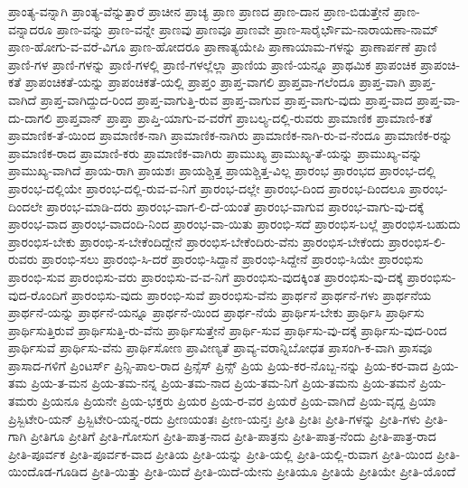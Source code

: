 {ಪ್ರಾಂತ್ಯ-ವನ್ನಾಗಿ
ಪ್ರಾಂತ್ಯ-ವೆನ್ನುತ್ತಾರೆ
ಪ್ರಾಚೀನ
ಪ್ರಾಚ್ಯ
ಪ್ರಾಣ
ಪ್ರಾಣದ
ಪ್ರಾಣ-ದಾನ
ಪ್ರಾಣ-ಬಿಡುತ್ತೇನೆ
ಪ್ರಾಣ-ವನ್ನಾದರೂ
ಪ್ರಾಣ-ವನ್ನು
ಪ್ರಾಣ-ವನ್ನೇ
ಪ್ರಾಣವು
ಪ್ರಾಣವೂ
ಪ್ರಾಣವೇ
ಪ್ರಾಣ-ಸಾರೈರ್ಭೌಮ-ನಾರಾಯಣಾ-ನಾಮ್
ಪ್ರಾಣ-ಹೋಗು-ವ-ವರೆ-ವಿಗೂ
ಪ್ರಾಣ-ಹೋದರೂ
ಪ್ರಾಣಾತ್ಯಯೇಪಿ
ಪ್ರಾಣಾಯಾಮ-ಗಳನ್ನು
ಪ್ರಾಣಾರ್ಪಣೆ
ಪ್ರಾಣಿ
ಪ್ರಾಣಿ-ಗಳ
ಪ್ರಾಣಿ-ಗಳನ್ನು
ಪ್ರಾಣಿ-ಗಳಲ್ಲಿ
ಪ್ರಾಣಿ-ಗಳಲ್ಲೆಲ್ಲಾ
ಪ್ರಾಣಿಯ
ಪ್ರಾಣಿ-ಯನ್ನೂ
ಪ್ರಾಥಮಿಕ
ಪ್ರಾಪಂಚಿಕ
ಪ್ರಾಪಂಚಿ-ಕತೆ
ಪ್ರಾಪಂಚಿಕತೆ-ಯನ್ನು
ಪ್ರಾಪಂಚಿಕತೆ-ಯಲ್ಲಿ
ಪ್ರಾಪ್ತಂ
ಪ್ರಾಪ್ತ-ವಾಗಲಿ
ಪ್ರಾಪ್ತವಾ-ಗಲೆಂದೂ
ಪ್ರಾಪ್ತ-ವಾಗಿ
ಪ್ರಾಪ್ತ-ವಾಗಿದೆ
ಪ್ರಾಪ್ತ-ವಾಗಿದ್ದುದ-ರಿಂದ
ಪ್ರಾಪ್ತ-ವಾಗುತ್ತಿ-ರುವ
ಪ್ರಾಪ್ತ-ವಾಗುವ
ಪ್ರಾಪ್ತ-ವಾಗು-ವುದು
ಪ್ರಾಪ್ತ-ವಾದ
ಪ್ರಾಪ್ತ-ವಾ-ದು-ದಾಗಲಿ
ಪ್ರಾಪ್ತವಾನ್
ಪ್ರಾಪ್ತಾ
ಪ್ರಾಪ್ತಿ-ಯಾಗು-ವ-ವರೆಗೆ
ಪ್ರಾಬಲ್ಯ-ದಲ್ಲಿ-ರುವರು
ಪ್ರಾಮಾಣಿಕ
ಪ್ರಾಮಾಣಿ-ಕತೆ
ಪ್ರಾಮಾಣಿಕ-ತೆ-ಯಿಂದ
ಪ್ರಾಮಾಣಿಕ-ನಾಗಿ
ಪ್ರಾಮಾಣಿಕ-ನಾಗಿರು
ಪ್ರಾಮಾಣಿಕ-ನಾಗಿ-ರು-ವ-ನೆಂದೂ
ಪ್ರಾಮಾಣಿಕ-ರನ್ನು
ಪ್ರಾಮಾಣಿಕ-ರಾದ
ಪ್ರಾಮಾಣಿ-ಕರು
ಪ್ರಾಮಾಣಿಕ-ವಾಗಿರು
ಪ್ರಾಮುಖ್ಯ
ಪ್ರಾಮುಖ್ಯ-ತೆ-ಯನ್ನು
ಪ್ರಾಮುಖ್ಯ-ವನ್ನು
ಪ್ರಾಮುಖ್ಯ-ವಾಗಿದೆ
ಪ್ರಾಯ-ರಾಗಿ
ಪ್ರಾಯಶಃ
ಪ್ರಾಯಶ್ಚಿತ್ತ
ಪ್ರಾಯಶ್ಚಿತ್ತ-ವಿಲ್ಲ
ಪ್ರಾರಂಭ
ಪ್ರಾರಂಭದ
ಪ್ರಾರಂಭ-ದಲ್ಲಿ
ಪ್ರಾರಂಭ-ದಲ್ಲಿಯೇ
ಪ್ರಾರಂಭ-ದಲ್ಲಿ-ರುವ-ವ-ನಿಗೆ
ಪ್ರಾರಂಭ-ದಲ್ಲೇ
ಪ್ರಾರಂಭ-ದಿಂದ
ಪ್ರಾರಂಭ-ದಿಂದಲೂ
ಪ್ರಾರಂಭ-ದಿಂದಲೇ
ಪ್ರಾರಂಭ-ಮಾಡಿ-ದರು
ಪ್ರಾರಂಭ-ವಾಗ-ಲಿ-ದೆ-ಯಂತೆ
ಪ್ರಾರಂಭ-ವಾಗುವ
ಪ್ರಾರಂಭ-ವಾಗು-ವು-ದಕ್ಕೆ
ಪ್ರಾರಂಭ-ವಾದ
ಪ್ರಾರಂಭ-ವಾದಂದಿ-ನಿಂದ
ಪ್ರಾರಂಭ-ವಾ-ಯಿತು
ಪ್ರಾರಂಭಿ-ಸದೆ
ಪ್ರಾರಂಭಿಸ-ಬಲ್ಲೆ
ಪ್ರಾರಂಭಿಸ-ಬಹುದು
ಪ್ರಾರಂಭಿಸ-ಬೇಕು
ಪ್ರಾರಂಭಿ-ಸ-ಬೇಕೆಂದಿದ್ದೇನೆ
ಪ್ರಾರಂಭಿಸ-ಬೇಕೆಂದಿರು-ವೆನು
ಪ್ರಾರಂಭಿಸ-ಬೇಕೆಂದು
ಪ್ರಾರಂಭಿಸ-ಲಿ-ರುವರು
ಪ್ರಾರಂಭಿ-ಸಲು
ಪ್ರಾರಂಭಿ-ಸಿ-ದರೆ
ಪ್ರಾರಂಭಿ-ಸಿದ್ದಾನೆ
ಪ್ರಾರಂಭಿ-ಸಿದ್ದೇನೆ
ಪ್ರಾರಂಭಿ-ಸಿಯೇ
ಪ್ರಾರಂಭಿಸು
ಪ್ರಾರಂಭಿ-ಸುವ
ಪ್ರಾರಂಭಿಸು-ವರು
ಪ್ರಾರಂಭಿಸು-ವ-ವ-ನಿಗೆ
ಪ್ರಾರಂಭಿಸು-ವುದಕ್ಕಿಂತ
ಪ್ರಾರಂಭಿಸು-ವು-ದಕ್ಕೆ
ಪ್ರಾರಂಭಿಸು-ವುದ-ರೊಂದಿಗೆ
ಪ್ರಾರಂಭಿಸು-ವುದು
ಪ್ರಾರಂಭಿ-ಸುವೆ
ಪ್ರಾರಂಭಿಸು-ವೆನು
ಪ್ರಾರ್ಥನೆ
ಪ್ರಾರ್ಥನೆ-ಗಳು
ಪ್ರಾರ್ಥನೆಯ
ಪ್ರಾರ್ಥನೆ-ಯನ್ನು
ಪ್ರಾರ್ಥನೆ-ಯನ್ನೂ
ಪ್ರಾರ್ಥನೆ-ಯಿಂದ
ಪ್ರಾರ್ಥ-ನೆಯೆ
ಪ್ರಾರ್ಥಿಸ-ಬೇಕು
ಪ್ರಾರ್ಥಿಸಿ
ಪ್ರಾರ್ಥಿಸು
ಪ್ರಾರ್ಥಿಸುತ್ತಿರುವೆ
ಪ್ರಾರ್ಥಿಸುತ್ತಿ-ರು-ವೆನು
ಪ್ರಾರ್ಥಿಸುತ್ತೇನೆ
ಪ್ರಾರ್ಥಿ-ಸುವ
ಪ್ರಾರ್ಥಿಸು-ವು-ದಕ್ಕೆ
ಪ್ರಾರ್ಥಿಸು-ವುದ-ರಿಂದ
ಪ್ರಾರ್ಥಿಸುವೆ
ಪ್ರಾರ್ಥಿಸು-ವೆನು
ಪ್ರಾರ್ಥಿಸೋಣ
ಪ್ರಾವೀಣ್ಯತೆ
ಪ್ರಾವ್ಯ-ವರಾನ್ನಿಬೋಧತ
ಪ್ರಾಸಂಗಿ-ಕ-ವಾಗಿ
ಪ್ರಾಸವೂ
ಪ್ರಾಸಾದ-ಗಳಿಗೆ
ಪ್ರಿಂಟರ್ಸ್
ಪ್ರಿನ್ಸಿ-ಪಾಲ-ರಾದ
ಪ್ರಿನ್ಸೆಸ್
ಪ್ರಿನ್ಸ್
ಪ್ರಿಯ
ಪ್ರಿಯ-ಕರ-ನೊಬ್ಬ-ನನ್ನು
ಪ್ರಿಯ-ಕರ-ವಾದ
ಪ್ರಿಯ-ತಮ
ಪ್ರಿಯ-ತ-ಮನ
ಪ್ರಿಯ-ತಮ-ನನ್ನ
ಪ್ರಿಯ-ತಮ-ನಾದ
ಪ್ರಿಯ-ತಮ-ನಿಗೆ
ಪ್ರಿಯ-ತಮನು
ಪ್ರಿಯ-ತಮನೆ
ಪ್ರಿಯ-ತಮರು
ಪ್ರಿಯನೂ
ಪ್ರಿಯನೇ
ಪ್ರಿಯ-ಭಕ್ತರು
ಪ್ರಿಯರ
ಪ್ರಿಯ-ರ-ವರ
ಪ್ರಿಯರೆ
ಪ್ರಿಯ-ವಾಗಿದೆ
ಪ್ರಿಯ-ವೃದ್ದ
ಪ್ರಿಯಾ
ಪ್ರಿಸ್ಬಿಟೇರಿ-ಯನ್
ಪ್ರಿಸ್ಬಿಟೇರಿ-ಯನ್ನ-ರದು
ಪ್ರೀಣಯಂತಃ
ಪ್ರೀಣ-ಯನ್ತಃ
ಪ್ರೀತಿ
ಪ್ರೀತಿಃ
ಪ್ರೀತಿ-ಗಳನ್ನು
ಪ್ರೀತಿ-ಗಳು
ಪ್ರೀತಿ-ಗಾಗಿ
ಪ್ರೀತಿಗೂ
ಪ್ರೀತಿಗೆ
ಪ್ರೀತಿ-ಗೋಸುಗ
ಪ್ರೀತಿ-ಪಾತ್ರ-ನಾದ
ಪ್ರೀತಿ-ಪಾತ್ರನು
ಪ್ರೀತಿ-ಪಾತ್ರ-ನೆಂದು
ಪ್ರೀತಿ-ಪಾತ್ರ-ರಾದ
ಪ್ರೀತಿ-ಪೂರ್ವಕ
ಪ್ರೀತಿ-ಪೂರ್ವಕ-ವಾದ
ಪ್ರೀತಿಯ
ಪ್ರೀತಿ-ಯನ್ನು
ಪ್ರೀತಿ-ಯಲ್ಲಿ
ಪ್ರೀತಿ-ಯಲ್ಲಿ-ರುವಾಗ
ಪ್ರೀತಿ-ಯಿಂದ
ಪ್ರೀತಿ-ಯಿಂದೊಡ-ಗೂಡಿದ
ಪ್ರೀತಿ-ಯಿತ್ತು
ಪ್ರೀತಿ-ಯಿದೆ
ಪ್ರೀತಿ-ಯಿದೆ-ಯೇನು
ಪ್ರೀತಿಯೂ
ಪ್ರೀತಿಯೆ
ಪ್ರೀತಿಯೇ
ಪ್ರೀತಿ-ಯೊಂದೆ
}
